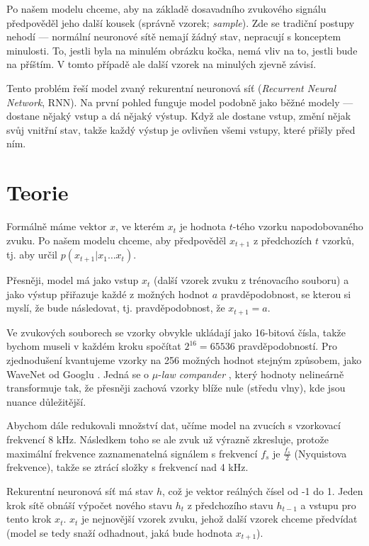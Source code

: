 \documentclass[a4]{article}
\begin{document}
Po našem modelu chceme, aby na základě dosavadního zvukového signálu předpověděl jeho další kousek (správně vzorek; \textit{sample}). Zde se tradiční postupy nehodí --- normální neuronové sítě nemají žádný stav, nepracují s konceptem minulosti. To, jestli byla na minulém obrázku kočka, nemá vliv na to, jestli bude na příštím. V tomto případě ale další vzorek na minulých zjevně závisí.

Tento problém řeší model zvaný rekurentní neuronová síť (\textit{Recurrent Neural Network}, RNN). Na první pohled funguje model podobně jako běžné modely --- dostane nějaký vstup a dá nějaký výstup. Když ale dostane vstup, změní nějak svůj vnitřní stav, takže každý výstup je ovlivňen všemi vstupy, které přišly před ním.

\section{Teorie} \label{teorie}

Formálně máme vektor $x$, ve kterém $x_t$ je hodnota $t$-tého vzorku napodobovaného zvuku. Po našem modelu chceme, aby předpověděl $x_{t+1}$ z předchozích $t$ vzorků, tj. aby určil $p(x_{t+1} | x_{1} \dots x_{t})$.

Přesněji, model má jako vstup $x_t$ (další vzorek zvuku z trénovacího souboru) a jako výstup přiřazuje každé z možných hodnot $a$ pravděpodobnost, se kterou si myslí, že bude následovat, tj. pravděpodobnost, že $x_{t+1}=a$.

Ve zvukových souborech se vzorky obvykle ukládají jako 16-bitová čísla, takže bychom museli v každém kroku spočítat $2^{16} = 65 536$ pravděpodobností. Pro zjednodušení kvantujeme vzorky na 256 možných hodnot stejným způsobem, jako WaveNet od Googlu \cite{wavenet}. Jedná se o $\mu$-\textit{law compander} \cite{mulaw}, který hodnoty nelineárně transformuje tak, že přesněji zachová vzorky blíže nule (středu vlny), kde jsou nuance důležitější.

Abychom dále redukovali množství dat, učíme model na zvucích s vzorkovací frekvencí 8 kHz. Následkem toho se ale zvuk už výrazně zkresluje, protože maximální frekvence zaznamenatelná signálem s frekvencí $f_s$ je $\frac{f_s}{2}$ (Nyquistova frekvence), takže se ztrácí složky s frekvencí nad 4 kHz.

Rekurentní neuronová síť má stav $h$, což je vektor reálných čísel od -1 do 1. Jeden krok sítě obnáší výpočet nového stavu $h_t$ z předchozího stavu $h_{t-1}$ a vstupu pro tento krok $x_t$. $x_t$ je nejnovější vzorek zvuku, jehož další vzorek chceme předvídat (model se tedy snaží odhadnout, jaká bude hodnota $x_{t+1}$).
\end{document}
